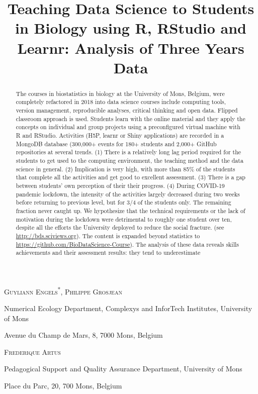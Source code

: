 \documentclass{aims}
\title[Teaching Data Science in
Biology] %
      {Teaching Data Science to Students in Biology using R, RStudio and
Learnr: Analysis of Three Years Data}
\author[Guyliann Engels, Philippe Grosjean and Frédérique Artus]{}
\theoremstyle{definition}
\begin{document}
\maketitle

\centerline{\scshape Guyliann Engels\textsuperscript{*}, Philippe Grosjean}
\medskip
{\footnotesize
 \centerline{Numerical Ecology Department, Complexys and InforTech Institutes, University of Mons}
   \centerline{Avenue du Champ de Mars, 8, 7000 Mons, Belgium}
} %

\medskip

\centerline{\scshape Frederique Artus}

\medskip
{\footnotesize
 \centerline{ Pedagogical Support and Quality Assurance Department, University of Mons}
   \centerline{Place du Parc, 20, 700 Mons, Belgium}
}

\bigskip



\begin{abstract}
  The courses in biostatistics in biology at the University of Mons,
  Belgium, were completely refactored in 2018 into data science courses
  include computing tools, version management, reproducible analyses,
  critical thinking and open data. Flipped classroom approach is used.
  Students learn with the online material and they apply the concepts on
  individual and group projects using a preconfigured virtual machine
  with R and RStudio. Activities (H5P, learnr or Shiny applications) are
  recorded in a MongoDB database (300,000+ events for 180+ students and
  2,000+ GitHub repositories at several trends. (1) There is a
  relatively long lag period required for the students to get used to
  the computing environment, the teaching method and the data science in
  general. (2) Implication is very high, with more than 85\% of the
  students that complete all the activities and get good to excellent
  assessment. (3) There is a gap between students' own perception of
  their their progress. (4) During COVID-19 pandemic lockdown, the
  intensity of the activities largely decreased during two weeks before
  returning to previous level, but for 3/4 of the students only. The
  remaining fraction never caught up. We hypothesize that the technical
  requirements or the lack of motivation during the lockdown were
  detrimental to roughly one student over ten, despite all the efforts
  the University deployed to reduce the social fracture. (see
  \url{http://bds.sciviews.org}). The content is expanded beyond
  statistics to \url{https://github.com/BioDataScience-Course}). The
  analysis of these data reveals skills achievements and their
  assessment results: they tend to underestimate
\end{abstract}
\end{document}
